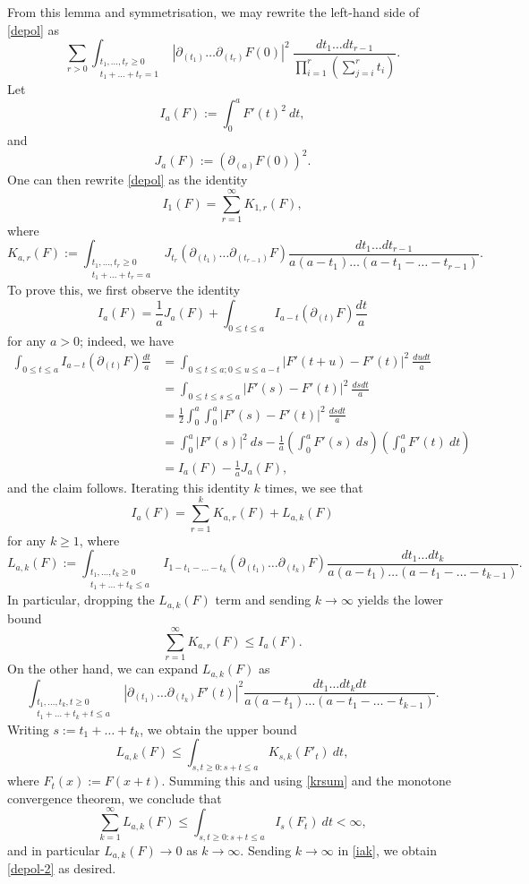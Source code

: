 \documentclass{bmcart}
\theoremstyle{plain}
\theoremstyle{definition}
\begin{document}
From this lemma and symmetrisation, we may rewrite the left-hand side of \eqref{depol} as
$$
 \sum_{r>0} \int_{\substack{t_1,\dots,t_r \geq 0\\ t_1+\dots+t_r =1}} |\partial_{(t_1)} \dots \partial_{(t_r)} F(0)|^2\ \frac{dt_1 \dots dt_{r-1}}{\prod_{i=1}^r(\sum_{j=i}^rt_i)}.$$
Let
$$ I_a(F) := \int_0^a F'(t)^2\ dt,$$
and
$$ J_a(F) := (\partial_{(a)} F(0))^2.$$
One can then rewrite \eqref{depol} as the identity
\begin{equation}\label{depol-2}
 I_1(F) = \sum_{r=1}^\infty K_{1,r}(F),
\end{equation}
where
$$ K_{a,r}(F) := \int_{\substack{t_1,\dots,t_r \geq 0\\ t_1+\dots+t_r =a}} J_{t_r}( \partial_{(t_1)} \dots \partial_{(t_{r-1})} F) \frac{dt_1 \dots dt_{r-1}}{a(a-t_1) \dots (a-t_1-\dots-t_{r-1})}.$$
To prove this, we first observe the identity
$$ I_a(F) = \frac{1}{a} J_a(F) + \int_{0 \leq t \leq a} I_{a-t}( \partial_{(t)} F ) \frac{dt}{a}$$
for any $a>0$; indeed, we have
\begin{align*}
\int_{0 \leq t \leq a} I_{a-t}( \partial_{(t)} F ) \frac{dt}{a} &=
\int_{0 \leq t \leq a; 0 \leq u \leq a-t} |F'(t+u) - F'(t)|^2\ \frac{du dt}{a} \\
&= \int_{0 \leq t \leq s \leq a} |F'(s) - F'(t)|^2\ \frac{ds dt}{a} \\
&= \frac{1}{2} \int_0^a \int_0^a |F'(s) - F'(t)|^2\ \frac{ds dt}{a} \\
&= \int_0^a |F'(s)|^2\ ds - \frac{1}{a} \left(\int_0^a F'(s)\ ds\right) \left(\int_0^a F'(t)\ dt\right) \\
&= I_a(F) - \frac{1}{a} J_a(F),
\end{align*}
and the claim follows.  Iterating this identity $k$ times, we see that
\begin{equation}\label{iak}
I_a(F) = \sum_{r=1}^k K_{a,r}(F) + L_{a,k}(F)
\end{equation}
for any $k \geq 1$, where
$$ L_{a,k}(F) := \int_{\substack{t_1,\dots,t_k \geq 0\\ t_1+\dots+t_k \leq a}} I_{1-t_1-\dots-t_k}( \partial_{(t_1)} \dots \partial_{(t_k)} F) \frac{dt_1 \dots dt_k}{a(a-t_1) \dots (a-t_1-\dots-t_{k-1})}.$$
In particular, dropping the $L_{a,k}(F)$ term and sending $k \to \infty$ yields the lower bound
\begin{equation}\label{krsum}
\sum_{r=1}^\infty K_{a,r}(F) \leq I_a(F).
\end{equation}
On the other hand, we can expand $L_{a,k}(F)$ as
$$ \int_{\substack{t_1,\dots,t_k,t \geq 0\\t_1+\dots+t_k+t \leq a}} |\partial_{(t_1)} \dots \partial_{(t_k)} F'(t)|^2 \frac{dt_1 \dots dt_k dt}{a(a-t_1) \dots (a-t_1-\dots-t_{k-1})}.$$
Writing $s := t_1 + \dots + t_k$, we obtain the upper bound
$$ L_{a,k}(F) \leq \int_{s,t \geq 0: s+t \leq a} K_{s,k}( F'_t )\ dt,$$
where $F_t(x) := F(x+t)$.  Summing this and using \eqref{krsum} and the monotone convergence theorem, we conclude that
$$ \sum_{k=1}^\infty L_{a,k}(F) \leq \int_{s,t \geq 0: s+t \leq a} I_{s}( F_t )\ dt < \infty,$$
and in particular $L_{a,k}(F) \to 0$ as $k \to \infty$.  Sending $k \to \infty$ in \eqref{iak}, we obtain \eqref{depol-2} as desired.
\end{document}
